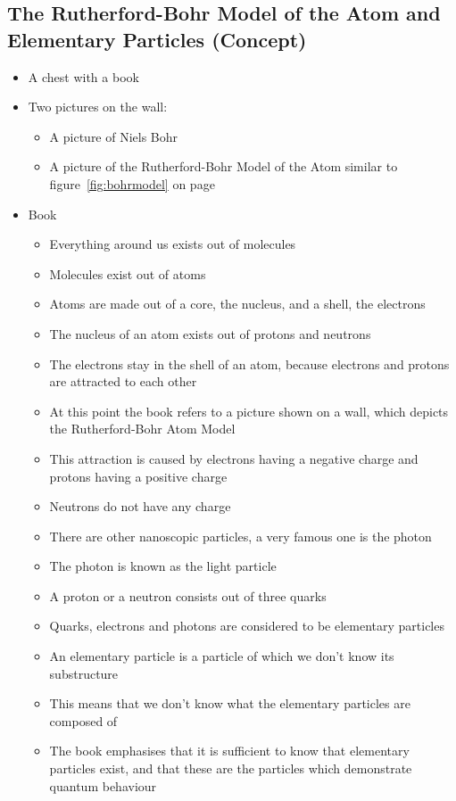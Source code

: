 \documentclass[11pt,twoside]{report} %
\begin{document}
\subsection{The Rutherford-Bohr Model of the Atom and Elementary Particles (Concept)}
\begin{itemize}
	\item A chest with a book
	\item Two pictures on the wall:
	\begin{itemize}
		\item A picture of Niels Bohr
		\item A picture of the Rutherford-Bohr Model of the Atom similar to figure~\ref{fig:bohrmodel} on page~\pageref{fig:bohrmodel}
	\end{itemize}
	\item Book
	\begin{itemize}
		\item Everything around us exists out of molecules
		\item Molecules exist out of atoms
		\item Atoms are made out of a core, the nucleus, and a shell, the electrons
		\item The nucleus of an atom exists out of protons and neutrons
		\item The electrons stay in the shell of an atom, because electrons and protons are attracted to each other
		\item At this point the book refers to a picture shown on a wall, which depicts the Rutherford-Bohr Atom Model
		\item This attraction is caused by electrons having a negative charge and protons having a positive charge
		\item Neutrons do not have any charge
		\item There are other nanoscopic particles, a very famous one is the photon
		\item The photon is known as the light particle
		\item A proton or a neutron consists out of three quarks
		\item Quarks, electrons and photons are considered to be elementary particles
		\item An elementary particle is a particle of which we don’t know its substructure
		\item This means that we don’t know what the elementary particles are composed of
		\item The book emphasises that it is sufficient to know that elementary particles exist, and that these are the particles which demonstrate quantum behaviour

\end{itemize}
\end{itemize}
\end{document}
